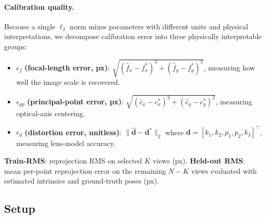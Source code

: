 \documentclass[11pt]{article}
\begin{document}
\paragraph{Calibration quality.}
Because a single $\ell_2$ norm mixes parameters with different units and
physical interpretations, we decompose calibration error into three
physically interpretable groups:
\begin{itemize}[leftmargin=1.5em]
  \item $\epsilon_f$ \textbf{(focal-length error, px)}: $\sqrt{(\hat{f}_x - f_x^*)^2 + (\hat{f}_y - f_y^*)^2}$, measuring how well the image scale is recovered.
  \item $\epsilon_{pp}$ \textbf{(principal-point error, px)}: $\sqrt{(\hat{c}_x - c_x^*)^2 + (\hat{c}_y - c_y^*)^2}$, measuring optical-axis centering.
  \item $\epsilon_d$ \textbf{(distortion error, unitless)}: $\|\hat{\mathbf{d}} - \mathbf{d}^*\|_2$ where $\mathbf{d} = [k_1, k_2, p_1, p_2, k_3]^\top$, measuring lens-model accuracy.
\end{itemize}
\textbf{Train-RMS}: reprojection RMS on selected $K$ views (px).
\textbf{Held-out RMS}: mean per-point reprojection error on the remaining
$N-K$ views evaluated with estimated intrinsics and ground-truth poses (px).

\subsection{Setup}
\end{document}
